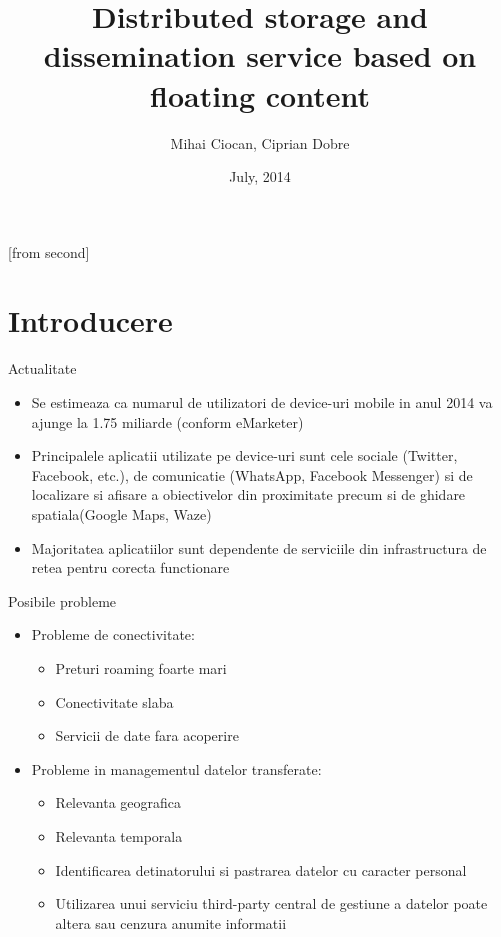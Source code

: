 \documentclass{beamer}
\title[Distributed storage and dissemination service based on floating
content]{Distributed storage and dissemination service based on floating
content}
\institute{Automatic Control and Computers Faculty,\\
	University Politehnica of Bucharest}
\author[Mihai Ciocan, Ciprian Dobre]{Mihai Ciocan, Ciprian Dobre}
\date{July, 2014}
\begin{document}
[from second]


\frame{\titlepage}

\frame{\tableofcontents}

\section{Introducere}

\begin{frame}{Actualitate}
	\begin{itemize}
		\item Se estimeaza ca numarul de utilizatori de device-uri mobile in anul
		2014 va ajunge la 1.75 miliarde (conform eMarketer)
		\item Principalele aplicatii utilizate pe device-uri sunt cele sociale
		(Twitter, Facebook, etc.), de comunicatie (WhatsApp, Facebook Messenger) si de
		localizare si afisare a obiectivelor din proximitate precum si de
		ghidare spatiala(Google Maps, Waze)
		\item Majoritatea aplicatiilor sunt dependente de serviciile din
		infrastructura de retea pentru corecta functionare
	\end{itemize}
\end{frame}

\begin{frame}{Posibile probleme}
	\begin{itemize}
	  \item Probleme de conectivitate:
	  \begin{itemize}
	    \item Preturi roaming foarte mari
	  	\item Conectivitate slaba
	  	\item Servicii de date fara acoperire
	  \end{itemize}
	  \item Probleme in managementul datelor transferate:
	  \begin{itemize}
	    \item Relevanta geografica
	    \item Relevanta temporala
	    \item Identificarea detinatorului si pastrarea datelor cu caracter personal
	    \item Utilizarea unui serviciu third-party central de gestiune a datelor
	    poate altera sau cenzura anumite informatii
	  \end{itemize}
	\end{itemize}
\end{frame}
\end{document}
